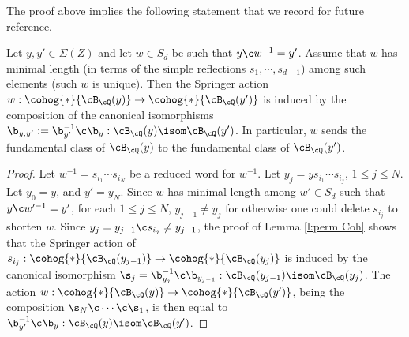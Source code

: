 The proof above implies the following statement that we record for future reference.
\begin{lemma}
\notready\label{l:min w} Let $y,y'\in \Sigma(Z)$ and let $w\in S_{d}$ be such that $y\c w^{-1}=y'$. Assume that $w$ has minimal length (in terms of the simple reflections $s_{1},\cdots, s_{d-1}$) among such elements (such $w$ is unique). Then the Springer action $w: \cohog{*}{\cB_{\cQ}(y)}\to \cohog{*}{\cB_{\cQ}(y')}$ is induced by the composition of the canonical isomorphisms $\b_{y,y'}:=\b_{y'}^{-1}\c\b_{y}: \cB_{\cQ}(y)\isom \cB_{\cQ}(y')$. In particular, $w$ sends the fundamental class of $\cB_{\cQ}(y)$ to the fundamental class of $\cB_{\cQ}(y')$.
\end{lemma}
\begin{proof}
Let $w^{-1}=s_{i_{1}}\cdots s_{i_{N}}$ be a reduced word for $w^{-1}$. Let $y_{j}=ys_{i_{1}}\cdots s_{i_{j}}$, $1\le j\le N$. Let $y_{0}=y$, and $y'=y_{N}$. Since $w$ has minimal length among $w'\in S_{d}$ such that $y\c w'^{-1}=y'$, for each $1\le j\le N$, $y_{j-1}\ne y_{j}$ for otherwise one could delete $s_{i_{j}}$ to shorten $w$. Since $y_{j}=y_{j-1}\c s_{i_{j}}\ne y_{j-1}$, the proof of Lemma \ref{l:perm Coh} shows that the Springer action of $s_{i_{j}}: \cohog{*}{\cB_{\cQ}(y_{j-1})}\to \cohog{*}{\cB_{\cQ}(y_{j})}$ is induced by the canonical isomorphism $\s_{j}=\b^{-1}_{y_{j}}\c\b_{y_{j-1}}: \cB_{\cQ}(y_{j-1})\isom \cB_{\cQ}(y_{j})$. The action $w: \cohog{*}{\cB_{\cQ}(y)}\to \cohog{*}{\cB_{\cQ}(y')}$, being the composition $\s_{N}\c\cdots\c\s_{1}$, is then equal to $\b_{y'}^{-1}\c\b_{y}:\cB_{\cQ}(y)\isom \cB_{\cQ}(y')$.
\end{proof}



